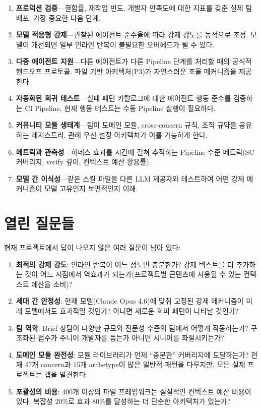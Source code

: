 \documentclass[11pt,a4paper,openright,twoside]{report}
\begin{document}
\begin{enumerate}
  \item \textbf{프로덕션 검증}---결함률, 재작업 빈도, 개발자 만족도에 대한 지표를 갖춘 실제 팀 배포. 가장 중요한 다음 단계.
  \item \textbf{모델 적응형 강제}---관찰된 에이전트 준수율에 따라 강제 강도를 동적으로 조정. 모델이 개선되면 일부 인라인 반복이 불필요한 오버헤드가 될 수 있다.
  \item \textbf{다중 에이전트 지원}---다른 에이전트가 다른 Pipeline 단계를 처리할 때의 공식적 핸드오프 프로토콜. 파일 기반 아키텍처(P3)가 자연스러운 조율 메커니즘을 제공한다.
  \item \textbf{자동화된 회귀 테스트}---실패 패턴 카탈로그에 대한 에이전트 행동 준수를 검증하는 CI Pipeline. 현재 행동 테스트는 수동 Pipeline 실행이 필요하다.
  \item \textbf{커뮤니티 모듈 생태계}---팀이 도메인 모듈, cross-concern 규칙, 조직 규약을 공유하는 레지스트리. 관례 우선 설정 아키텍처가 이를 가능하게 한다.
  \item \textbf{메트릭과 관측성}---하네스 효과를 시간에 걸쳐 추적하는 Pipeline 수준 메트릭(SC 커버리지, verify 깊이, 컨텍스트 예산 활용률).
  \item \textbf{모델 간 이식성}---같은 스킬 파일을 다른 LLM 제공자와 테스트하여 어떤 강제 메커니즘이 모델 고유인지 보편적인지 이해.
\end{enumerate}

\section{열린 질문들}

현재 프로젝트에서 답이 나오지 않은 여러 질문이 남아 있다:

\begin{enumerate}
  \item \textbf{최적의 강제 강도}: 인라인 반복이 어느 정도면 충분한가? 강제 텍스트를 더 추가하는 것이 어느 시점에서 역효과가 되는가(프로젝트별 콘텐츠에 사용될 수 있는 컨텍스트 예산을 소비)?
  \item \textbf{세대 간 안정성}: 현재 모델(Claude Opus 4.6)에 맞춰 교정된 강제 메커니즘이 미래 모델에서도 효과적일 것인가? 아니면 새로운 회피 패턴이 나타날 것인가?
  \item \textbf{팀 역학}: Brief 상담이 다양한 규모와 전문성 수준의 팀에서 어떻게 작동하는가? 구조화된 접수가 주니어 개발자를 돕는가 아니면 시니어를 좌절시키는가?
  \item \textbf{도메인 모듈 완전성}: 모듈 라이브러리가 언제 ``충분한'' 커버리지에 도달하는가? 현재 47개 concern과 15개 archetype이 많은 일반적 패턴을 다루지만, 모든 실제 프로젝트는 갭을 발견한다.
  \item \textbf{포괄성의 비용}: 400개 이상의 파일 프레임워크는 실질적인 컨텍스트 예산 비용이 있다. 복잡성 20\%로 효과 80\%를 달성하는 더 단순한 아키텍처가 있는가?
\end{enumerate}
\end{document}
